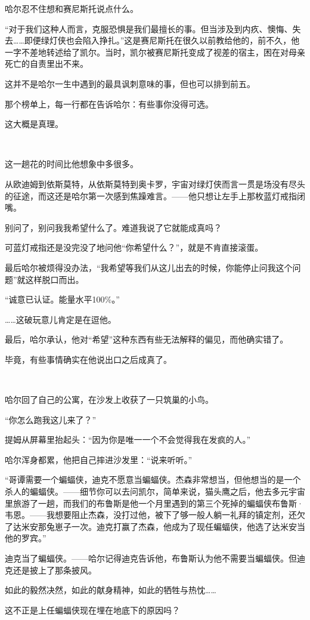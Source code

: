 \documentclass[../main]{subfiles}
\begin{document}
哈尔忍不住想和赛尼斯托说点什么。

“对于我们这种人而言，克服恐惧是我们最擅长的事。但当涉及到内疚、懊悔、失去……即便绿灯侠也会陷入挣扎。”这是赛尼斯托在很久以前教给他的，前不久，他一字不差地转述给了凯尔。当时，凯尔被赛尼斯托变成了视差的宿主，困在对母亲死亡的自责里出不来。

这并不是哈尔一生中遇到的最具讽刺意味的事，但也可以排到前五。

那个榜单上，每一行都在告诉哈尔：有些事你没得可选。

这大概是真理。

~\

这一趟花的时间比他想象中多很多。

从欧迪姆到依斯莫特，从依斯莫特到奥卡罗，宇宙对绿灯侠而言一贯是场没有尽头的征途，而这还是哈尔第一次感到焦躁难言。——他只想让左手上那枚蓝灯戒指闭嘴。

别问了，别问我我希望什么了。难道我说了它就能成真吗？

可蓝灯戒指还是没完没了地问他“你希望什么？”，就是不肯直接滚蛋。

最后哈尔被烦得没办法，“我希望等我们从这儿出去的时候，你能停止问我这个问题”就这样脱口而出。

“诚意已认证。能量水平100\%。”

……这破玩意儿肯定是在逗他。

最后，哈尔承认，他对“希望”这种东西有些无法解释的偏见，而他确实错了。

毕竟，有些事情确实在他说出口之后成真了。

~\

哈尔回了自己的公寓，在沙发上收获了一只筑巢的小鸟。

“你怎么跑我这儿来了？”

提姆从屏幕里抬起头：“因为你是唯一一个不会觉得我在发疯的人。”

哈尔浑身都累，他把自己摔进沙发里：“说来听听。”

“哥谭需要一个蝙蝠侠，迪克不愿意当蝙蝠侠。杰森非常想当，但他想当的是一个杀人的蝙蝠侠。——细节你可以去问凯尔，简单来说，猫头鹰之后，他去多元宇宙里旅游了一趟，而我们的布鲁斯是他一个月里遇到的第三个死掉的蝙蝠侠布鲁斯·韦恩。——我想要阻止杰森，没打过他，被下了够一般人躺一礼拜的镇定剂，还欠了达米安那兔崽子一次。迪克打赢了杰森，他成为了现任蝙蝠侠，他选了达米安当他的罗宾。”

迪克当了蝙蝠侠。——哈尔记得迪克告诉他，布鲁斯认为他不需要当蝙蝠侠。但迪克还是披上了那条披风。

如此的毅然决然，如此的献身精神，如此的牺牲与热忱……

这不正是上任蝙蝠侠现在埋在地底下的原因吗？
\end{document}
